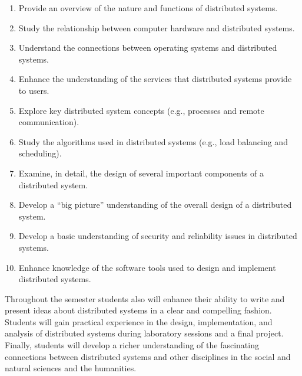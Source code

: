 \begin{enumerate}

  \itemsep 0in

  \item Provide an overview of the nature and functions of distributed systems.

  \item Study the relationship between computer hardware and distributed systems.

  \item Understand the connections between operating systems and distributed systems.

  \item Enhance the understanding of the services that distributed systems provide to users.

  \item Explore key distributed system concepts (e.g., processes and remote communication).

  \item Study the algorithms used in distributed systems (e.g., load balancing and scheduling).

  \item Examine, in detail, the design of several important components of a distributed system.

  \item Develop a ``big picture'' understanding of the overall design of a distributed system.

  \item Develop a basic understanding of security and reliability issues in distributed systems.

  \item Enhance knowledge of the software tools used to design and implement distributed systems.

\end{enumerate}

\vspace*{-.075in}

\noindent Throughout the semester students also will enhance their ability to write and present ideas about distributed
systems in a clear and compelling fashion.  Students will gain practical experience in the design, implementation, and
analysis of distributed systems during laboratory sessions and a final project. Finally, students will develop a richer
understanding of the fascinating connections between distributed systems and other disciplines in the social and natural
sciences and the humanities.

